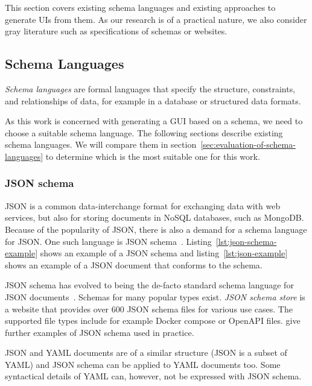 
This section covers existing schema languages and existing approaches to generate UIs from them.
As our research is of a practical nature, we also consider gray literature such as specifications of schemas or websites.
\subsection{Schema Languages}\label{subsec:schemalanguages}

\textit{Schema languages} are formal languages that specify the structure, constraints, and relationships of data, for example in a database or structured data formats.

As this work is concerned with generating a GUI based on a schema, we need to choose a suitable schema language.
The following sections describe existing schema languages.
We will compare them in section~\ref{sec:evaluation-of-schema-languages} to determine which is the most suitable one for this work.

\subsubsection{JSON schema}

JSON is a common data-interchange format for exchanging data with web services, but also for storing documents in NoSQL databases, such as MongoDB\@\cite{marrs2017json}.
Because of the popularity of JSON, there is also a demand for a schema language for JSON\@.
One such language is JSON schema~\cite{jsonSchema, jsonschemaJSONSchema}.
Listing~\ref{lst:json-schema-example} shows an example of a JSON schema and listing~\ref{lst:json-example} shows an example of a JSON document that conforms to the schema.

JSON schema has evolved to being the de-facto standard schema language for JSON documents~\cite{baazizi2021empirical}.
Schemas for many popular \cfgfile{} types exist.
\textit{JSON schema store}\cite{schemastoreJSONSchema} is a website that provides over 600 JSON schema files for various use cases.
The supported file types include for example Docker compose or OpenAPI files.
\cite{barbaglia, ChaeronySiffa2022} give further examples of JSON schema used in practice.

JSON and YAML documents are of a similar structure (JSON is a subset of YAML) and JSON schema can be applied to YAML documents too.
Some syntactical details of YAML can, however, not be expressed with JSON schema.

